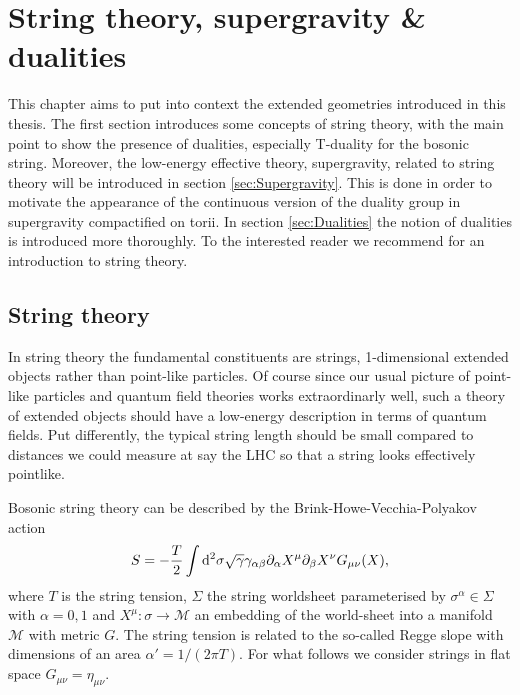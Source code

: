 \chapter{String theory, supergravity \& dualities\label{chap:StringTheory}}


This chapter aims to put into context the extended geometries introduced in this thesis. The first section introduces some concepts of string theory, with the main point to show the presence of dualities, especially T-duality for the bosonic string. Moreover, the low-energy effective theory, supergravity, related to string theory will be introduced in section \ref{sec:Supergravity}. This is done in order to motivate the appearance of the continuous version of the duality group in supergravity compactified on torii. In section \ref{sec:Dualities} the notion of dualities is introduced more thoroughly. To the interested reader we recommend \cite{Blumenhagen2013,TongLectureNotes} for an introduction to string theory.


\section{String theory}
In string theory the fundamental constituents are strings, 1-dimensional extended objects rather than point-like particles. Of course since our usual picture of point-like particles and quantum field theories works extraordinarly well, such a theory of extended objects should have a low-energy description in terms of quantum fields. Put differently, the typical string length should be small compared to distances we could measure at say the LHC so that a string looks effectively pointlike. 

Bosonic string theory can be described by the Brink-Howe-Vecchia-Polyakov action
\begin{equation}
    S = -\frac{T}{2}\int \mathrm{d}^2\sigma \sqrt{\gamma}\gamma_{\alpha\beta}\partial_\alpha X^\mu\partial_\beta X^\nu G_{\mu\nu}(X),
\end{equation}
where $T$ is the string tension, $\Sigma$ the string worldsheet parameterised by $\sigma^{\alpha}\in\Sigma$ with $\alpha=0,1$ and $X^\mu: \sigma \to \mathcal{M}$  an embedding of the world-sheet into a manifold $\mathcal{M}$ with metric $G$. The string tension is related to the so-called Regge slope with dimensions of an area $\alpha'= 1/(2\pi T)$. For what follows we consider strings in flat space $G_{\mu\nu}=\eta_{\mu\nu}$. 

